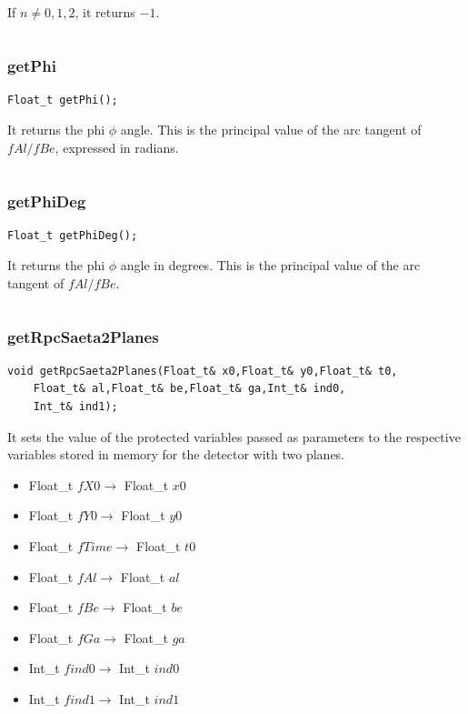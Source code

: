 \documentclass[a4paper]{book}
\begin{document}
If $n \neq 0, 1, 2$, it returns $-1$.

\[\]

\subsubsection{getPhi}

\begin{lstlisting}
Float_t getPhi();
\end{lstlisting}

It returns the phi $\phi$ angle. This is the principal value of the arc tangent of $fAl/fBe$, expressed in radians.

\[\]

\subsubsection{getPhiDeg}

\begin{lstlisting}
Float_t getPhiDeg();
\end{lstlisting}

It returns the phi $\phi$ angle in degrees. This is the principal value of the arc tangent of $fAl/fBe$.

\[\]

\subsubsection{getRpcSaeta2Planes}

\begin{lstlisting}
void getRpcSaeta2Planes(Float_t& x0,Float_t& y0,Float_t& t0,
	Float_t& al,Float_t& be,Float_t& ga,Int_t& ind0,
	Int_t& ind1);
\end{lstlisting}

It sets the value of the protected variables passed as parameters to the respective variables stored in memory for the detector with two planes.

\begin{itemize}
	\item Float\_t $fX0 \rightarrow$ Float\_t $x0$
	\item Float\_t $fY0 \rightarrow$ Float\_t $y0$
	\item Float\_t $fTime \rightarrow$ Float\_t $t0$
	\item Float\_t $fAl \rightarrow$ Float\_t $al$
	\item Float\_t $fBe \rightarrow$ Float\_t $be$
	\item Float\_t $fGa \rightarrow$ Float\_t $ga$
	\item Int\_t $find0 \rightarrow$ Int\_t $ind0$
	\item Int\_t $find1 \rightarrow$ Int\_t $ind1$
\end{itemize}
\end{document}
